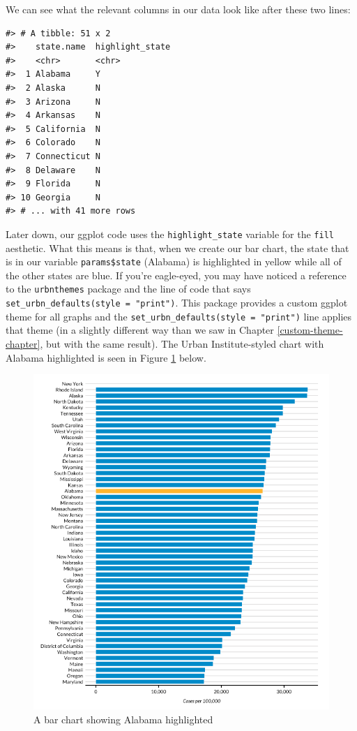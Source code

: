 \documentclass[
]{book}
\begin{document}
We can see what the relevant columns in our data look like after these two lines:

\begin{verbatim}
#> # A tibble: 51 x 2
#>    state.name  highlight_state
#>    <chr>       <chr>          
#>  1 Alabama     Y              
#>  2 Alaska      N              
#>  3 Arizona     N              
#>  4 Arkansas    N              
#>  5 California  N              
#>  6 Colorado    N              
#>  7 Connecticut N              
#>  8 Delaware    N              
#>  9 Florida     N              
#> 10 Georgia     N              
#> # ... with 41 more rows
\end{verbatim}

Later down, our ggplot code uses the \texttt{highlight\_state} variable for the \texttt{fill} aesthetic. What this means is that, when we create our bar chart, the state that is in our variable \texttt{params\$state} (Alabama) is highlighted in yellow while all of the other states are blue. If you're eagle-eyed, you may have noticed a reference to the \texttt{urbnthemes} package and the line of code that says \texttt{set\_urbn\_defaults(style\ =\ "print")}. This package provides a custom ggplot theme for all graphs and the \texttt{set\_urbn\_defaults(style\ =\ "print")} line applies that theme (in a slightly different way than we saw in Chapter \ref{custom-theme-chapter}, but with the same result). The Urban Institute-styled chart with Alabama highlighted is seen in Figure \ref{fig:alabama-covid-chart} below.

\begin{figure}
\includegraphics[width=1\linewidth]{assets/alabama-covid-chart} \caption{A bar chart showing Alabama highlighted}\label{fig:alabama-covid-chart}
\end{figure}
\end{document}
